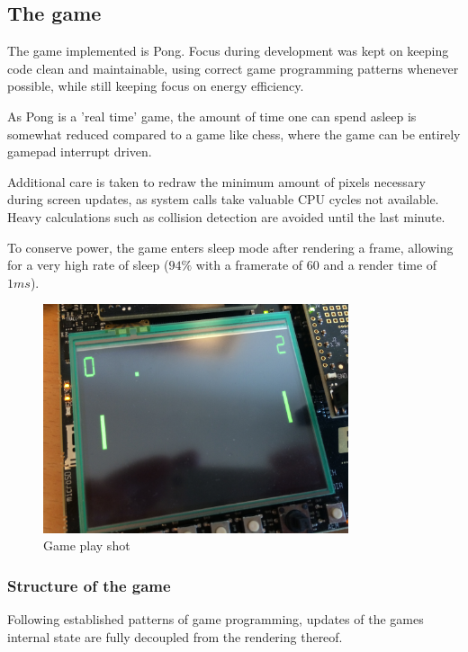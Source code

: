 \subsection{The game}

The game implemented is Pong. Focus during development was kept on keeping code
clean and maintainable, using correct game programming patterns whenever
possible, while still keeping focus on energy efficiency.

As Pong is a 'real time' game, the amount of time one can spend asleep is
somewhat reduced compared to a game like chess,
where the game can be entirely gamepad interrupt driven.

Additional care is taken to redraw the minimum amount of pixels necessary
during screen updates, as system calls take valuable CPU cycles not available.
Heavy calculations such as collision detection are avoided until the last
minute.

To conserve power, the game enters sleep mode after rendering a frame,
allowing for a very high rate of sleep
($ 94\% $ with a framerate of $ 60 $ and a render time of $ 1 ms $).

\begin{figure}[H]
\centering
\includegraphics[width=0.8\textwidth]{figures/gameplay.jpg}
\caption{Game play shot}

\end{figure}

\subsubsection{Structure of the game}

Following established patterns of game programming, updates of the games
internal state are fully decoupled from the rendering thereof.

